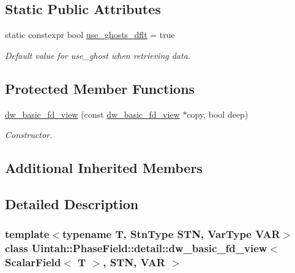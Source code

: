 \subsection*{Static Public Attributes}
\begin{DoxyCompactItemize}
\item 
static constexpr bool \hyperlink{classUintah_1_1PhaseField_1_1detail_1_1dw__basic__fd__view_3_01ScalarField_3_01T_01_4_00_01STN_00_01VAR_01_4_a2e418e1016be0d58b9f1fbcaf16f2fa5}{use\+\_\+ghosts\+\_\+dflt} = true
\begin{DoxyCompactList}\small\item\em Default value for use\+\_\+ghost when retrieving data. \end{DoxyCompactList}\end{DoxyCompactItemize}
\subsection*{Protected Member Functions}
\begin{DoxyCompactItemize}
\item 
\hyperlink{classUintah_1_1PhaseField_1_1detail_1_1dw__basic__fd__view_3_01ScalarField_3_01T_01_4_00_01STN_00_01VAR_01_4_a24526a2c0daca0cb39b13a1b61fcda83}{dw\+\_\+basic\+\_\+fd\+\_\+view} (const \hyperlink{classUintah_1_1PhaseField_1_1detail_1_1dw__basic__fd__view}{dw\+\_\+basic\+\_\+fd\+\_\+view} $\ast$copy, bool deep)
\begin{DoxyCompactList}\small\item\em Constructor. \end{DoxyCompactList}\end{DoxyCompactItemize}
\subsection*{Additional Inherited Members}


\subsection{Detailed Description}
\subsubsection*{template$<$typename T, Stn\+Type S\+TN, Var\+Type V\+AR$>$\newline
class Uintah\+::\+Phase\+Field\+::detail\+::dw\+\_\+basic\+\_\+fd\+\_\+view$<$ Scalar\+Field$<$ T $>$, S\+T\+N, V\+A\+R $>$}

